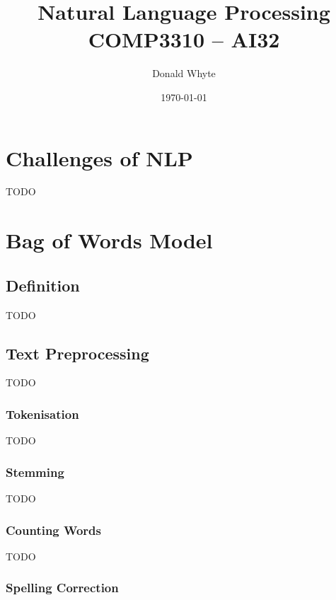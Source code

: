 \documentclass{article}
\title{Natural Language Processing \\ COMP3310 -- AI32}
\author{Donald Whyte}
\date{\today}
\begin{document}
\maketitle

\pagebreak
\tableofcontents

\pagebreak
\listoffigures

\pagebreak
\listoftables

\pagebreak

\section{Challenges of NLP}

TODO

\section{Bag of Words Model}

\subsection{Definition}

TODO

\subsection{Text Preprocessing}

TODO

\subsubsection{Tokenisation}

TODO

\subsubsection{Stemming}

TODO

\subsubsection{Counting Words}

TODO

\subsubsection{Spelling Correction}
\end{document}
